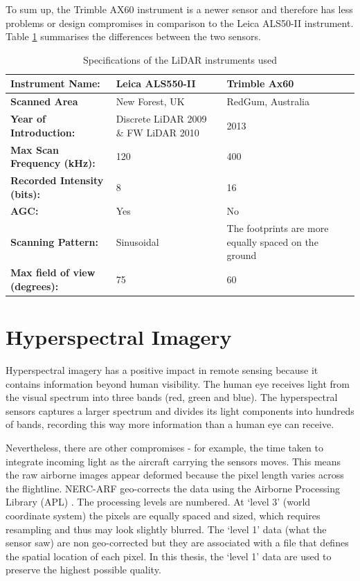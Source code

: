 \documentclass{subfiles}
\begin{document}
	To sum up, the Trimble AX60 instrument is a newer sensor and therefore has less problems or design compromises in comparison to the Leica ALS50-II instrument. Table \ref{tab:InstrumentsSpecs} summarises the differences between the two sensors. 
	
	\begin{table}[!htbp]
		\caption{Specifications of the LiDAR instruments used}
		\label{tab:InstrumentsSpecs}%
		\centering
		\begin{tabular}{|l||m{}|m{}|}
			\hline
			\textbf{Instrument Name:}	& \textbf{Leica ALS550-II}     & \textbf{Trimble Ax60  }    \\
			\hline\hline
			\textbf{Scanned Area} & New Forest, UK & RedGum, Australia \\
			\hline
			\textbf{Year of Introduction: }&Discrete LiDAR 2009 \& FW LiDAR 2010& 2013  \\
			\hline
			\textbf{Max Scan Frequency (kHz):} & 120 & 400  \\
			\hline
			\textbf{Recorded Intensity (bits):} & 8 & 16 \\
			\hline
			\textbf{AGC:} & Yes & No \\
			\hline
			\textbf{Scanning Pattern:} & Sinusoidal  & The footprints are more equally spaced on the ground \\			
			\hline
			\textbf{Max field of view (degrees):} & 75 & 60	\\
			\hline
		\end{tabular}%
	\end{table}
	


	\section{Hyperspectral Imagery}\label{sec:HyperspectralImages}
	\par Hyperspectral imagery has a positive impact in remote sensing because it contains information beyond human visibility. The human eye receives light from the visual spectrum into three bands (red, green and blue). The hyperspectral sensors captures a larger spectrum and divides its light components into hundreds of bands, recording this way more information than a human eye can receive\cite{Smith2012}. 
	
	\par Nevertheless, there are other compromises - for example, the time taken to integrate incoming light as the aircraft carrying the sensors moves.  This means the raw airborne images appear deformed because the pixel length varies across the flightline. NERC-ARF geo-corrects the data using the Airborne Processing Library (APL) \cite{Warren2014}. The processing levels are numbered. At `level 3' (world coordinate system) the pixels are equally spaced and sized, which requires resampling and thus may look slightly blurred. The `level 1' data (what the sensor saw) are non geo-corrected but they are associated with a file that defines the spatial location of each pixel.  In this thesis, the `level 1' data are used to preserve the highest possible quality.
\end{document}
